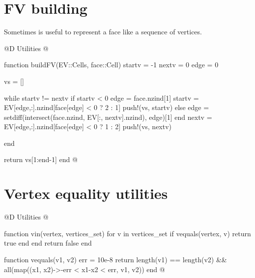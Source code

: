 \section{FV building}

Sometimes is useful to represent a face like a sequence of vertices.

@D Utilities
@{function buildFV(EV::Cells, face::Cell)
    startv = -1
    nextv = 0
    edge = 0

    vs = []

    while startv != nextv
        if startv < 0
            edge = face.nzind[1]
            startv = EV[edge,:].nzind[face[edge] < 0 ? 2 : 1]
            push!(vs, startv)
        else
            edge = setdiff(intersect(face.nzind, EV[:, nextv].nzind), edge)[1]
        end
        nextv = EV[edge,:].nzind[face[edge] < 0 ? 1 : 2]
        push!(vs, nextv)

    end

    return vs[1:end-1]
end
@}



\section{Vertex equality utilities}

@D Utilities
@{function vin(vertex, vertices_set)
    for v in vertices_set
        if vequals(vertex, v)
            return true
        end
    end
    return false
end

function vequals(v1, v2)
    err = 10e-8
    return length(v1) == length(v2) && all(map((x1, x2)->-err < x1-x2 < err, v1, v2))
end
@}